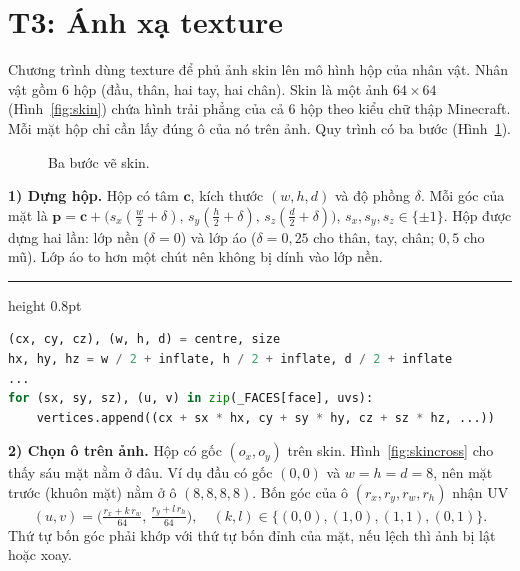 \documentclass[9pt,twocolumn,a4paper]{extarticle}
\newenvironment{codebox}{\par\vspace{5pt}\noindent\begin{minipage}{\columnwidth}\hrule height 0.8pt\vspace{2pt}}{\end{minipage}\par\vspace{5pt}\noindent\ignorespaces}
\newcommand{\code}[1]{\texttt{#1}}
\begin{document}
\section{T3: Ánh xạ texture}
\label{chap:t3}
Chương trình dùng texture để phủ ảnh skin lên mô hình hộp của nhân vật. Nhân vật gồm 6 hộp (đầu, thân, hai tay, hai chân). Skin là một ảnh $64\times64$ (Hình~\ref{fig:skin}) chứa hình trải phẳng của cả 6 hộp theo kiểu chữ thập Minecraft. Mỗi mặt hộp chỉ cần lấy đúng ô của nó trên ảnh. Quy trình có ba bước (Hình~\ref{fig:skinflow}).

\begin{figure}[H]
\centering
{}
\caption{Ba bước vẽ skin.}
\label{fig:skinflow}
\end{figure}

\textbf{1) Dựng hộp.} Hộp có tâm $\mathbf{c}$, kích thước $(w,h,d)$ và độ phồng $\delta$. Mỗi góc của mặt là
$\mathbf{p}=\mathbf{c}+\big(s_x(\tfrac w2+\delta),\,s_y(\tfrac h2+\delta),\,s_z(\tfrac d2+\delta)\big)$, $s_x,s_y,s_z\in\{\pm1\}$.
Hộp được dựng hai lần: lớp nền ($\delta=0$) và lớp áo ($\delta=0{,}25$ cho thân, tay, chân; $0{,}5$ cho mũ). Lớp áo to hơn một chút nên không bị dính vào lớp nền.

\begin{codebox}
\begin{lstlisting}[language=Python,caption={\code{render/avatar\_renderer.py}, \code{\_box}: góc $\mathbf{p}$ của mặt},label={lst:boxcorner}]
(cx, cy, cz), (w, h, d) = centre, size
hx, hy, hz = w / 2 + inflate, h / 2 + inflate, d / 2 + inflate
...
for (sx, sy, sz), (u, v) in zip(_FACES[face], uvs):
    vertices.append((cx + sx * hx, cy + sy * hy, cz + sz * hz, ...))
\end{lstlisting}
\end{codebox}

\textbf{2) Chọn ô trên ảnh.} Hộp có gốc $(o_x,o_y)$ trên skin. Hình~\ref{fig:skincross} cho thấy sáu mặt nằm ở đâu. Ví dụ đầu có gốc $(0,0)$ và $w=h=d=8$, nên mặt trước (khuôn mặt) nằm ở ô $(8,8,8,8)$. Bốn góc của ô $(r_x,r_y,r_w,r_h)$ nhận UV
\begin{equation}
(u,v)=\Big(\tfrac{r_x+k\,r_w}{64},\,\tfrac{r_y+l\,r_h}{64}\Big),\quad (k,l)\in\{(0,0),(1,0),(1,1),(0,1)\}.
\label{eq:skin-uv}
\end{equation}
Thứ tự bốn góc phải khớp với thứ tự bốn đỉnh của mặt, nếu lệch thì ảnh bị lật hoặc xoay.
\end{document}
